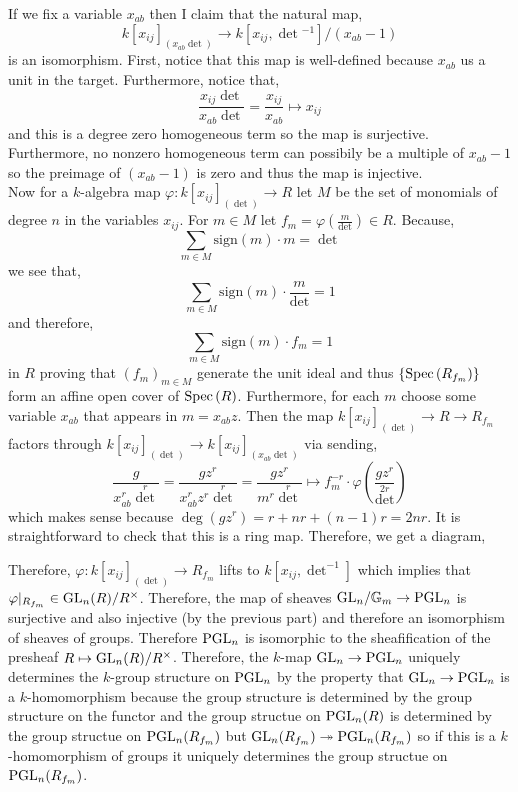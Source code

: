 \documentclass[12pt]{article}
\begin{document}
If we fix a variable $x_{ab}$ then I claim that the natural map,
\[ k[x_{ij}]_{(x_{ab} \det)} \to k[x_{ij}, \det{}^{-1}]/(x_{ab} - 1) \]
is an isomorphism. First, notice that this map is well-defined because $x_{ab}$ us a unit in the target. Furthermore, notice that,
\[ \frac{x_{ij} \det}{x_{ab} \det} = \frac{x_{ij}}{x_{ab}} \mapsto x_{ij} \]
and this is a degree zero homogeneous term so the map is surjective. Furthermore, no nonzero homogeneous term can possibily be a multiple of $x_{ab} - 1$ so the preimage of $(x_{ab} - 1)$ is zero and thus the map is injective. 
\bigskip\\
Now for a $k$-algebra map $\varphi : k[x_{ij}]_{(\det)} \to R$ let $M$ be the set of monomials of degree $n$ in the variables $x_{ij}$. For $m \in M$ let $f_m = \varphi(\frac{m}{\det}) \in R$. Because,
\[ \sum_{m \in M} \mathrm{sign}(m) \cdot m = \det \]
we see that,
\[ \sum_{m \in M} \mathrm{sign}(m) \cdot \frac{m}{\det} = 1 \]
and therefore,
\[ \sum_{m \in M} \mathrm{sign}(m) \cdot f_m = 1 \]
in $R$ proving that $(f_m)_{m \in M}$ generate the unit ideal and thus $\{ \mathrm{Spec}\left( R_{f_m} \right) \}$ form an affine open cover of $\mathrm{Spec}\left( R \right)$. Furthermore, for each $m$ choose some variable $x_{ab}$ that appears in $m = x_{ab} z$. Then the map $k[x_{ij}]_{(\det)} \to R \to R_{f_m}$ factors through $k[x_{ij}]_{(\det)} \to k[x_{ij}]_{(x_{ab} \det)}$ via sending,
\[ \frac{g}{x_{ab}^r \det^r} = \frac{g z^r}{x_{ab}^r z^r \det^r} = \frac{g z^r}{m^r \det^r} \mapsto f_m^{-r} \cdot \varphi \left( \frac{g z^r}{\det^{2r}} \right) \]
which makes sense because $\deg{(g z^r)} = r + n r + (n-1)r = 2nr$. It is straightforward to check that this is a ring map. Therefore, we get a diagram,
\begin{center}
\end{center}
Therefore, $\varphi : k[x_{ij}]_{(\det)} \to R_{f_m}$ lifts to $k[x_{ij}, \det^{-1}]$ which implies that $\varphi |_{R_{f_m}} \in \mathrm{GL}_n(R)/R^\times$. Therefore, the map of sheaves $\mathrm{GL}_n / {\mathbb{G}_m} \to \mathrm{PGL}_n$ is surjective and also injective (by the previous part) and therefore an isomorphism of sheaves of groups. Therefore $\mathrm{PGL}_n$ is isomorphic to the sheafification of the presheaf $R \mapsto \mathrm{GL}_n(R)/R^\times$. Therefore, the $k$-map $\mathrm{GL}_n \to \mathrm{PGL}_n$ uniquely determines the $k$-group structure on $\mathrm{PGL}_n$ by the property that $\mathrm{GL}_n \to \mathrm{PGL}_n$ is a $k$-homomorphism because the group structure is determined by the group structure on the functor and the group structue on $\mathrm{PGL}_n(R)$ is determined by the group structue on $\mathrm{PGL}_n(R_{f_m})$ but $\mathrm{GL}_n(R_{f_m}) \twoheadrightarrow \mathrm{PGL}_n(R_{f_m})$ so if this is a $k$-homomorphism of groups it uniquely determines the group structue on $\mathrm{PGL}_n(R_{f_m})$. 
\end{document}

